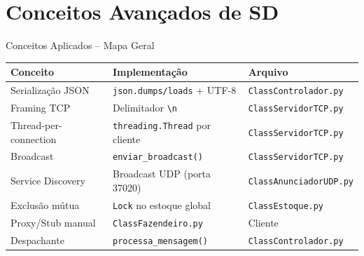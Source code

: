 \documentclass[aspectratio=169]{beamer}
\begin{document}
\section{Conceitos Avan\c{c}ados de SD}

\begin{frame}{Conceitos Aplicados -- Mapa Geral}
  \footnotesize
  \begin{tabular}{>{\raggedright\arraybackslash}p{3.5cm}>{\raggedright\arraybackslash}p{4cm}>{\raggedright\arraybackslash}p{3.5cm}}
    \toprule
    \textbf{Conceito} & \textbf{Implementa\c{c}\~ao} & \textbf{Arquivo} \\
    \midrule
    Serializa\c{c}\~ao JSON & \texttt{json.dumps/loads} + UTF-8 & \texttt{ClassControlador.py} \\
    Framing TCP & Delimitador \texttt{\textbackslash n} & \texttt{ClassServidorTCP.py} \\
    Thread-per-connection & \texttt{threading.Thread} por cliente & \texttt{ClassServidorTCP.py} \\
    Broadcast & \texttt{enviar\_broadcast()} & \texttt{ClassServidorTCP.py} \\
    Service Discovery & Broadcast UDP (porta 37020) & \texttt{ClassAnunciadorUDP.py} \\
    Exclus\~ao m\'utua & \texttt{Lock} no estoque global & \texttt{ClassEstoque.py} \\
    Proxy/Stub manual & \texttt{ClassFazendeiro.py} & Cliente \\
    Despachante & \texttt{processa\_mensagem()} & \texttt{ClassControlador.py} \\
    \bottomrule
  \end{tabular}
\end{frame}
\end{document}
